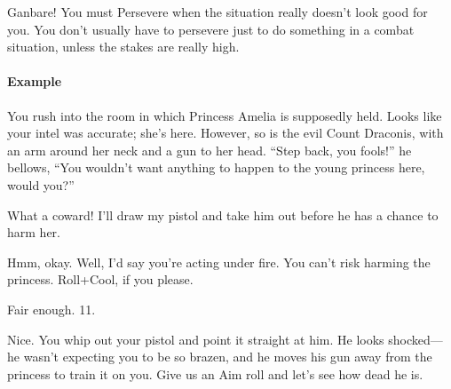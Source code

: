 




Ganbare! You must Persevere when the situation really doesn't look good for you. You don't usually have to persevere just to do something in a combat situation, unless the stakes are really high.


\paragraph{Example}
\begin{dialogue}
   You rush into the room in which Princess Amelia is
  supposedly held. Looks like your intel was accurate; she's
  here. However, so is the evil Count Draconis, with an arm around her
  neck and a gun to her head. ``Step back, you fools!'' he bellows,
  ``You wouldn't want anything to happen to the young princess here,
  would you?''

   What a coward! I'll draw my pistol and take him
  out before he has a chance to harm her.

   Hmm, okay. Well, I'd say you're acting under fire. You
  can't risk harming the princess. Roll+Cool, if you please.

   Fair enough. 11.

   Nice. You whip out your pistol and point it straight at him. 
  He looks shocked---he wasn't expecting you to be so brazen, and he
  moves his gun away from the princess to train it on you. Give us an
  Aim roll and let's see how dead he is.
\end{dialogue}


